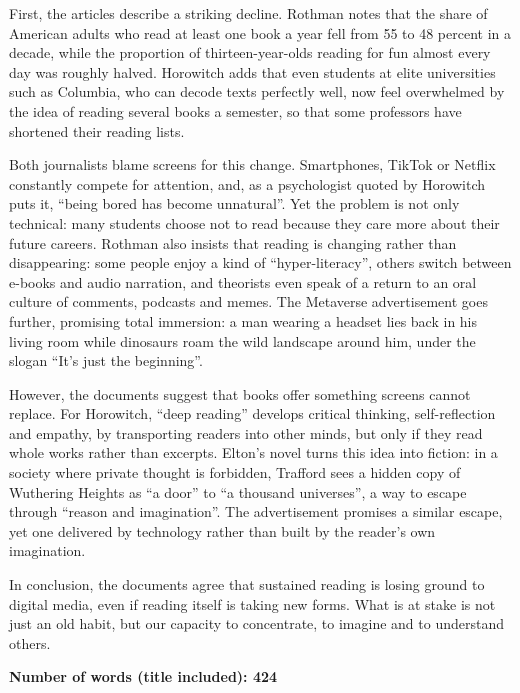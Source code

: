 \documentclass[11pt,a4paper]{article}
\begin{document}
First, the articles describe a striking decline. Rothman notes that the share of American adults who read at least one book a year fell from 55 to 48 percent in a decade, while the proportion of thirteen-year-olds reading for fun almost every day was roughly halved. Horowitch adds that even students at elite universities such as Columbia, who can decode texts perfectly well, now feel overwhelmed by the idea of reading several books a semester, so that some professors have shortened their reading lists.

Both journalists blame screens for this change. Smartphones, TikTok or Netflix constantly compete for attention, and, as a psychologist quoted by Horowitch puts it, ``being bored has become unnatural''. Yet the problem is not only technical: many students choose not to read because they care more about their future careers. Rothman also insists that reading is changing rather than disappearing: some people enjoy a kind of ``hyper-literacy'', others switch between e-books and audio narration, and theorists even speak of a return to an oral culture of comments, podcasts and memes. The Metaverse advertisement goes further, promising total immersion: a man wearing a headset lies back in his living room while dinosaurs roam the wild landscape around him, under the slogan ``It's just the beginning''.

However, the documents suggest that books offer something screens cannot replace. For Horowitch, ``deep reading'' develops critical thinking, self-reflection and empathy, by transporting readers into other minds, but only if they read whole works rather than excerpts. Elton's novel turns this idea into fiction: in a society where private thought is forbidden, Trafford sees a hidden copy of Wuthering Heights as ``a door'' to ``a thousand universes'', a way to escape through ``reason and imagination''. The advertisement promises a similar escape, yet one delivered by technology rather than built by the reader's own imagination.

In conclusion, the documents agree that sustained reading is losing ground to digital media, even if reading itself is taking new forms. What is at stake is not just an old habit, but our capacity to concentrate, to imagine and to understand others.

\textbf{Number of words (title included): 424}
\end{document}

